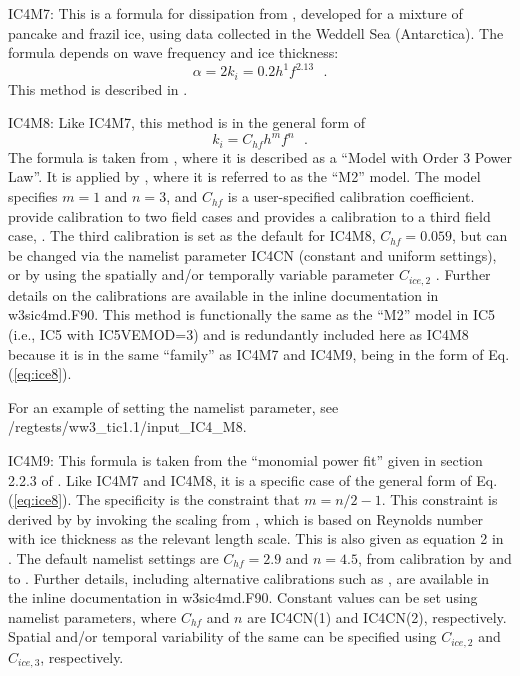 {\code IC4M7}: This is a formula for dissipation from \cite{art:Dob15}, developed for a mixture of pancake and frazil ice, using data collected in the Weddell Sea (Antarctica). The formula depends on wave frequency and ice thickness:
\begin{equation}\label{eq:ice7}
  {\alpha=2k_i=0.2h^1f^{2.13}} \:\:\: .
\end{equation}
This method is described in \cite{rep:RPLA18}.

{\code IC4M8}: Like {\code IC4M7}, this method is in the general form of
\begin{equation}\label{eq:ice8}
  {k_i=C_{hf}h^mf^n} \:\:\: .
\end{equation}
The formula is taken from \cite{Meylan2018}, where it is described as a ``Model with Order 3 Power Law''. It is applied by \cite{Liu2020}, where it is referred to as the ``M2'' model. The model specifies $m=1$ and $n=3$, and $C_{hf}$ is a user-specified calibration coefficient. \cite{Liu2020} provide calibration to two field cases and \cite{rep:RYW2021} provides a calibration to a third field case, \cite{art:RMK2021}. The third calibration is set as the default for {\code IC4M8}, $C_{hf}=0.059$, but can be changed via the namelist parameter {\code IC4CN} (constant and uniform settings), or by using the spatially and/or temporally variable parameter  ${C_{ice,2}}$ . Further details on the calibrations are available in the inline documentation in {\file w3sic4md.F90}.  This method is functionally the same as the ``{\code M2}'' model in {\code IC5} (i.e., {\code IC5} with {\code IC5VEMOD=3}) and is redundantly included here as {\code IC4M8} because it is in the same ``family'' as {\code IC4M7} and {\code IC4M9}, being in the form of Eq. (\ref{eq:ice8}).

For an example of setting the namelist parameter, see {\file /regtests/ww3\_tic1.1/input\_IC4\_M8}.

{\code IC4M9}: This formula is taken from the ``monomial power fit'' given in section 2.2.3 of \cite{rep:RYW2021}. Like {\code IC4M7} and {\code IC4M8}, it is a specific case of the general form of Eq. (\ref{eq:ice8}). The specificity is the constraint that $m=n/2-1$. This constraint is derived by \cite{rep:RYW2021} by invoking the scaling from \cite{art:YRW2019}, which is based on Reynolds number with ice thickness as the relevant length scale. This is also given as equation 2 in \cite{art:YRW2022}. The default namelist settings are $C_{hf}=2.9$ and $n=4.5$, from calibration by \cite{rep:RYW2021} and \cite{art:YRW2022} to  \cite{art:RMK2021}. Further details, including alternative calibrations such as \cite{art:Yu2022}, are available in the inline documentation in {\file w3sic4md.F90}. Constant values can be set using namelist parameters, where $C_{hf}$ and $n$ are {\code IC4CN(1)} and {\code IC4CN(2)}, respectively. Spatial and/or temporal variability of the same can be specified using ${C_{ice,2}}$ and ${C_{ice,3}}$, respectively.

